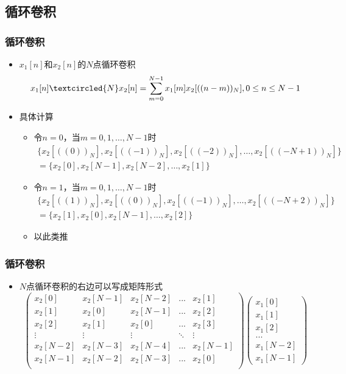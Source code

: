 \documentclass[CJKutf8,xcolor=pdftex,dvipsnames,table]{beamer}
\begin{document}
\begin{CJK*}{UTF8}{song}
  \section{循环卷积}
  
  \begin{frame}
    \frametitle{循环卷积}
    \begin{itemize}
    \item $x_1[n]$和$x_2[n]$的$N$点循环卷积
    \[
    	x_1[n] \textcircled{N} x_2[n]=\sum_{m=0}^{N-1}x_1[m]x_2[((n-m))_N], 0 \leq n \leq N-1
    \]    
    \item 具体计算
    	\begin{itemize}
		\item 令$n=0$，当$m=0, 1, \hdots, N-1$时
		\begin{align*}
			\{ x_2[((0))_N], x_2[((-1))_N], x_2[((-2))_N], \hdots, x_2[((-N+1))_N] \} & \\
		  = \{ x_2[0], x_2[N-1], x_2[N-2], \hdots, x_2[1] \} & 
		\end{align*}
		
		\item 令$n=1$，当$m=0, 1, \hdots, N-1$时
		\begin{align*}
			\{ x_2[((1))_N], x_2[((0))_N], x_2[((-1))_N], \hdots, x_2[((-N+2))_N] \} & \\
		  = \{ x_2[1], x_2[0], x_2[N-1], \hdots, x_2[2] \} & 
		\end{align*}	
		
		\item 以此类推	
		\end{itemize} 
	\end{itemize}
  \end{frame} 
        
  \begin{frame}
    \frametitle{循环卷积}
    \begin{itemize}
    \item $N$点循环卷积的右边可以写成矩阵形式
	\[
        \begin{pmatrix}
        x_2[0]      & x_2[N-1]   & x_2[N-2]  & ... & x_2[1] \\
        x_2[1]      & x_2[0]     & x_2[N-1]  & ... & x_2[2] \\
        x_2[2]      & x_2[1]     & x_2[0]    & ... & x_2[3] \\
        \vdots & \vdots & \vdots & \ddots & \vdots           \\
        x_2[N-2]    & x_2[N-3]   & x_2[N-4]  & ... & x_2[N-1] \\
        x_2[N-1]    & x_2[N-2]   & x_2[N-3]  & ... & x_2[0] \\
        \end{pmatrix}	
        \begin{pmatrix}
        x_1[0]  \\
        x_1[1]  \\
        x_1[2]  \\
        ...     \\
        x_1[N-2] \\
        x_1[N-1]
        \end{pmatrix}
	\]
		   

\end{itemize}
\end{frame}
\end{CJK*}
\end{document}

